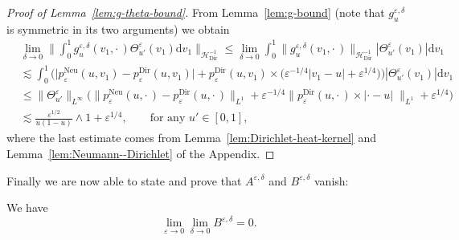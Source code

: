 \documentclass[AHL,Unicode,longabstracts]{cedram}
\DeclareMathOperator{\Dir}{Dir}
\DeclareMathOperator{\Neu}{Neu}
\newcommand{\mc}[1]{{\mathcal #1}}
\renewcommand{\mc}[1]{{\mathcal #1}}
\renewcommand{\leq}{\leqslant}
\newcommand*{\dd}{\mathrm{d}}
\newcommand*{\dv}{\dd v}
\begin{document}
\begin{proof}[Proof of Lemma~\ref{lem:g-theta-bound}]
From Lemma~\ref{lem:g-bound} (note that $g^{\varepsilon, \delta}_u$ is symmetric in its two arguments) we obtain
\begin{align*}
&\lim_{\delta \rightarrow 0} \bigg\| \int_0^1 g^{\varepsilon, \delta}_u (v_1, \cdot\,) \Theta^{\varepsilon}_{u'} (v_1) \dv_1 \bigg\|_{\mc H_{\Dir}^{- 1}} \leq \lim_{\delta \rightarrow 0} \int_0^1 \big\| g^{\varepsilon,
\delta}_u (v_1, \cdot\,) \big\|_{\mc H_{\Dir}^{- 1}} | \Theta^{\varepsilon}_{u'} (v_1) | \dv_1\\
&\lesssim\int_0^1 \Big(\big| p^{\Neu}_{\varepsilon} (u, v_1) - p^{\Dir}_{\varepsilon} (u, v_1) \big| + p^{\Dir}_{\varepsilon} (u, v_1) \times \big(\varepsilon^{- 1/4} | v_1 - u | + \varepsilon^{1/4} \big)\Big) | \Theta^{\varepsilon}_{u'} (v_1) | \dv_1\\
& \leq \| \Theta^{\varepsilon}_{u'} \|_{L^{\infty}} \Big(\big\| p^{\Neu}_{\varepsilon} (u, \cdot\,) - p^{\Dir}_{\varepsilon} (u, \cdot\,)
\big\|_{L^1} + \varepsilon^{- 1/4} \big\| p^{\Dir}_{\varepsilon} (u, \cdot\,) \times |
\cdot - u |\; \big\|_{L^1} + \varepsilon^{1/4}\Big)\\
& \lesssim \frac{\varepsilon^{1/2}}{u (1 - u)} \wedge 1 + \varepsilon^{1/4}, \qquad \text{for any } u' \in [0,1],
\end{align*}
where the last estimate comes from Lemma~\ref{lem:Dirichlet-heat-kernel} and Lemma~\ref{lem:Neumann--Dirichlet} of the Appendix.
\end{proof}

Finally we are now able to state and prove that $A^{\varepsilon,\delta}$ and $B^{\varepsilon, \delta}$ vanish:

\begin{lemm}\label{lem:Bdelta}
We have
\[
\lim_{\varepsilon \rightarrow 0} \lim_{\delta \rightarrow 0} B^{\varepsilon, \delta} = 0.
\]
\end{lemm}
\end{document}
